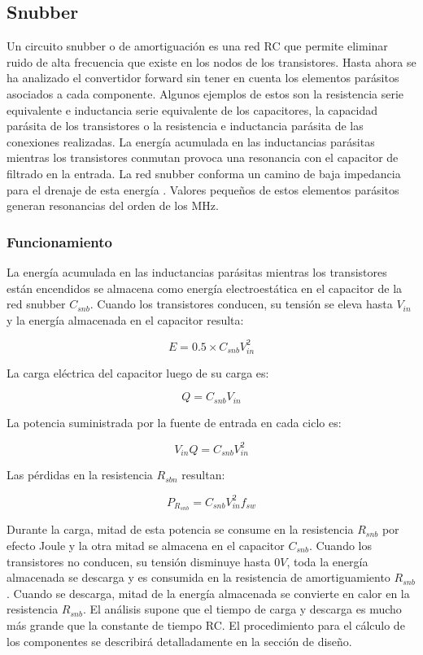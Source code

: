 \subsection{Snubber} \label{subsec:oscilaciones}

Un circuito snubber o de amortiguación es una red RC que permite eliminar ruido de alta frecuencia que existe en los nodos de los transistores.
Hasta ahora se ha analizado el convertidor forward sin tener en cuenta los elementos parásitos asociados a cada componente. 
Algunos ejemplos de estos son la resistencia serie equivalente e inductancia serie equivalente de los capacitores, 
la capacidad parásita de los transistores o la resistencia e inductancia parásita de las conexiones realizadas. 
La energía acumulada en las inductancias parásitas mientras los transistores conmutan provoca una resonancia con el capacitor de filtrado en la entrada. 
La red snubber conforma un camino de baja impedancia para el drenaje de esta energía \cite{snubber}. 
Valores pequeños de estos elementos parásitos generan resonancias del orden de los MHz. 

\subsubsection{Funcionamiento}

La energía acumulada en las inductancias parásitas mientras los transistores están encendidos se almacena como energía electroestática en el capacitor de la red snubber $C_{snb}$. 
Cuando los transistores conducen, su tensión se eleva hasta $V_{in}$ y la energía almacenada en el capacitor resulta: 

$$ E=0.5\times C_{snb}V_{in}^{2} $$

La carga eléctrica del capacitor luego de su carga es:

$$ Q=C_{snb}V_{in} $$

La potencia suministrada por la fuente de entrada en cada ciclo es:

$$ V_{in}Q=C_{snb}V_{in}^{2} $$

Las pérdidas en la resistencia $R_{sbn}$ resultan:

$$ P_{R_{snb}}=C_{snb}V_{in}^{2}f_{sw} $$

Durante la carga, mitad de esta potencia se consume en la resistencia $R_{snb}$ por efecto Joule y la otra mitad se almacena en el capacitor $C_{snb}$. 
Cuando los transistores no conducen, su tensión disminuye hasta $0V$, toda la energía almacenada se descarga y es consumida en la resistencia de amortiguamiento $R_{snb}$.
Cuando se descarga, mitad de la energía almacenada se convierte en calor en la resistencia $R_{snb}$. 
El análisis supone que el tiempo de carga y descarga es mucho más grande que la constante de tiempo RC. 
El procedimiento para el cálculo de los componentes se describirá detalladamente en la sección de diseño.